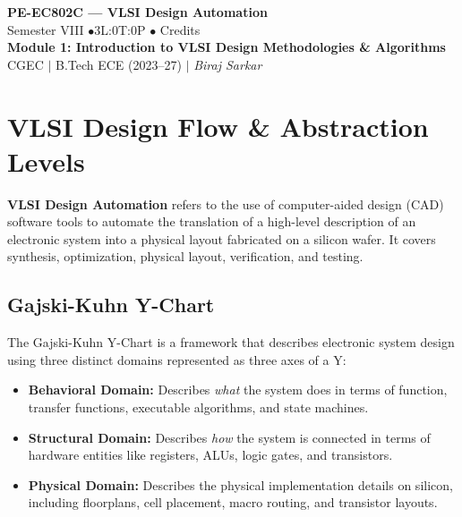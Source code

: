 \documentclass[12pt,a4paper]{article}
\begin{document}

\begin{center}
  {\LARGE\bfseries\color{myred} PE-EC802C --- VLSI Design Automation}\\[5pt]
  {\normalsize\color{mydark} Semester VIII \quad$\bullet$\quad 3L:0T:0P \quad$\bullet$ Credits}\\[3pt]
  {\normalsize\color{myteal}\textbf{Module 1: Introduction to VLSI Design Methodologies \& Algorithms}}\\[3pt]
  {\small\color{mydark} CGEC \;$|$\; B.Tech ECE (2023--27) \;$|$\; \textit{Biraj Sarkar}}
\end{center}
\vspace{2pt}
\noindent{\color{myred}\rule{\linewidth}{1.5pt}}
\vspace{2pt}

\hypersetup{linkcolor=mydark}
\tableofcontents
\hypersetup{linkcolor=myteal}
\newpage

\section{VLSI Design Flow \& Abstraction Levels}

\begin{tcolorbox}[defbox, title={VLSI Design Automation}]
  \textbf{VLSI Design Automation} refers to the use of computer-aided design (CAD) software tools to automate the translation of a high-level description of an electronic system into a physical layout fabricated on a silicon wafer. It covers synthesis, optimization, physical layout, verification, and testing.
\end{tcolorbox}

\subsection{Gajski-Kuhn Y-Chart}
The Gajski-Kuhn Y-Chart is a framework that describes electronic system design using three distinct domains represented as three axes of a Y:
\begin{itemize}[leftmargin=*, itemsep=2pt]
  \item \textbf{Behavioral Domain:} Describes \textit{what} the system does in terms of function, transfer functions, executable algorithms, and state machines.
  \item \textbf{Structural Domain:} Describes \textit{how} the system is connected in terms of hardware entities like registers, ALUs, logic gates, and transistors.
  \item \textbf{Physical Domain:} Describes the physical implementation details on silicon, including floorplans, cell placement, macro routing, and transistor layouts.
\end{itemize}
\end{document}
